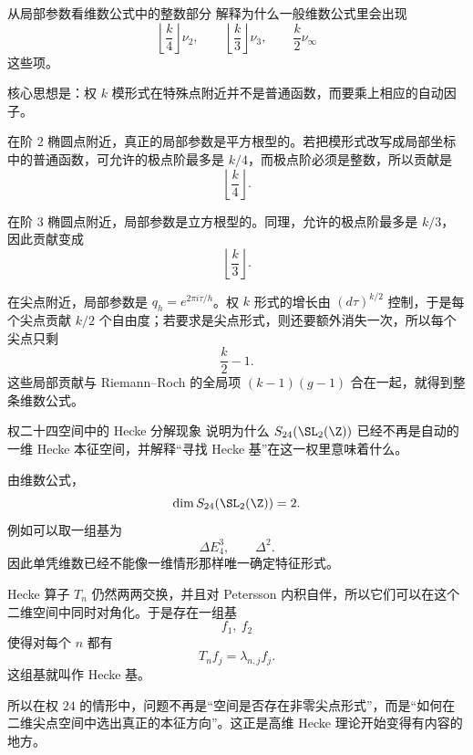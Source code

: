 \begin{problem}{从局部参数看维数公式中的整数部分}
\hard
解释为什么一般维数公式里会出现
\[
\left\lfloor\frac{k}{4}\right\rfloor\nu_2,
\qquad
\left\lfloor\frac{k}{3}\right\rfloor\nu_3,
\qquad
\frac{k}{2}\nu_\infty
\]
这些项。
\end{problem}
\begin{solution}
核心思想是：权 $k$ 模形式在特殊点附近并不是普通函数，而要乘上相应的自动因子。

在阶 $2$ 椭圆点附近，真正的局部参数是平方根型的。若把模形式改写成局部坐标中的普通函数，可允许的极点阶最多是 $k/4$，而极点阶必须是整数，所以贡献是
\[
\left\lfloor\frac{k}{4}\right\rfloor.
\]

在阶 $3$ 椭圆点附近，局部参数是立方根型的。同理，允许的极点阶最多是 $k/3$，因此贡献变成
\[
\left\lfloor\frac{k}{3}\right\rfloor.
\]

在尖点附近，局部参数是 $q_h=e^{2\pi i\tau/h}$。权 $k$ 形式的增长由 $(d\tau)^{k/2}$ 控制，于是每个尖点贡献 $k/2$ 个自由度；若要求是尖点形式，则还要额外消失一次，所以每个尖点只剩
\[
\frac{k}{2}-1.
\]
这些局部贡献与 Riemann--Roch 的全局项 $(k-1)(g-1)$ 合在一起，就得到整条维数公式。
\end{solution}

\begin{problem}{权二十四空间中的 Hecke 分解现象}
\hard
说明为什么 $S_{24}(\SL_2(\Z))$ 已经不再是自动的一维 Hecke 本征空间，并解释“寻找 Hecke 基”在这一权里意味着什么。
\end{problem}
\begin{solution}
由维数公式，
\[
\dim S_{24}(\SL_2(\Z))=2.
\]
例如可以取一组基为
\[
\Delta E_4^3,
\qquad
\Delta^2.
\]
因此单凭维数已经不能像一维情形那样唯一确定特征形式。

Hecke 算子 $T_n$ 仍然两两交换，并且对 Petersson 内积自伴，所以它们可以在这个二维空间中同时对角化。于是存在一组基
\[
f_1,\ f_2
\]
使得对每个 $n$ 都有
\[
T_n f_j=\lambda_{n,j}f_j.
\]
这组基就叫作 Hecke 基。

所以在权 $24$ 的情形中，问题不再是“空间是否存在非零尖点形式”，而是“如何在二维尖点空间中选出真正的本征方向”。这正是高维 Hecke 理论开始变得有内容的地方。
\end{solution}
